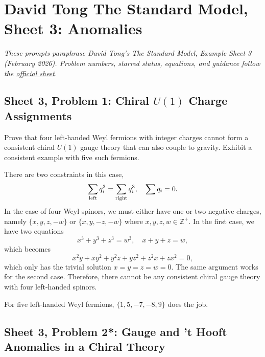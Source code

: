 \section{David Tong The Standard Model, Sheet 3: Anomalies}

\noindent\textit{These prompts paraphrase David Tong's \emph{The Standard Model},
Example Sheet 3 (February 2026). Problem numbers, starred status, equations,
and guidance follow the
\href{https://davidtong.org/pdfs/teaching/standard-model/rw3.pdf}{official sheet}.}

\subsection{Sheet 3, Problem 1: Chiral $U(1)$ Charge Assignments}

Prove that four left-handed Weyl fermions with integer charges cannot
form a consistent chiral $U(1)$ gauge theory that can also couple to
gravity. Exhibit a consistent example with five such fermions.
\begin{solution}
    There are two constraints in this case,
    \begin{equation}
        \sum_{\rm left}q_i^3 = \sum_{\rm right}q_i^3, \quad \sum q_i = 0.
    \end{equation}
    In the case of four Weyl spinors, we must either have one or two negative charges, namely $\{x,y,z,-w\}$ or $\{x,y,-z,-w\}$ where $x,y,z,w \in \mathbb{Z}^+$. In the first case, we have two equations
    \begin{equation}
        x^3 + y^3+z^3 = w^3, \quad x+y+z=w,
    \end{equation}
    which becomes
    \begin{equation}
        x^2y + xy^2 + y^2z + yz^2 + z^2x + zx^2 = 0,
    \end{equation}
    which only has the trivial solution $x = y =z = w=0$. The same argument works for the second case. Therefore, there cannot be any consistent chiral gauge theory with four left-handed spinors.

    For five left-handed Weyl fermions, $\{1,5,-7,-8,9\}$ does the job.
\end{solution}

\subsection{Sheet 3, Problem 2*: Gauge and 't Hooft Anomalies in a Chiral Theory}

